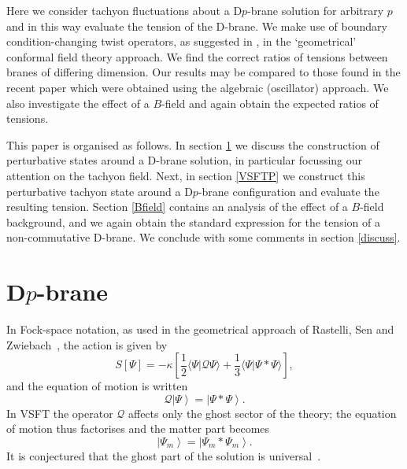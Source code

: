 \documentclass[letterpaper,12pt]{article}
\def\Pcm#1{{\mathcal{#1}}}
\begin{document}
Here we consider tachyon fluctuations about a D$p$-brane solution for arbitrary $p$ 
and in this way evaluate the tension of the D-brane. We make use of boundary condition-changing
twist operators, as suggested in \cite{RSZ4}, in the `geometrical' conformal field theory 
approach. We find the correct ratios of tensions between branes of differing dimension.
Our results may be compared to those found in the recent paper \cite{Okuyama}
 which were obtained using the algebraic (oscillator) \cite{Muk,GJ1,GJ2} approach.
We also investigate the effect of a $B$-field and again obtain the expected ratios of tensions.

This paper is organised as follows. In section \ref{Dpbrane} we discuss the construction of
perturbative states around a D-brane solution, in particular focussing our attention on 
the tachyon field. Next, in section \ref{VSFTP} we construct this perturbative tachyon state 
around a D$p$-brane configuration and evaluate the resulting tension. 
 Section \ref{Bfield} contains an analysis
of the effect of a $B$-field background, and we again obtain the standard expression for the
tension of a non-commutative D-brane. We conclude with some comments in section \ref{discuss}.

\section{D$p$-brane}
\label{Dpbrane}

In Fock-space notation, as used in the geometrical approach of Rastelli, Sen and 
Zwiebach~\cite{RSZ5}, the action is given by
\begin{equation}
\label{VSFTact}
S[\Psi]=-\kappa\left[\frac12\big\langle\Psi\big|\Pcm{Q}\Psi\big\rangle+\frac13\big\langle\Psi\big|\Psi * \Psi\big\rangle \right]
,\end{equation}
and the equation of motion is written
\begin{equation}
\label{EOM}
\Pcm{Q}\left|\Psi\right\rangle = \left|\Psi * \Psi \right\rangle
.\end{equation}
In VSFT the operator $\Pcm{Q}$ affects only the ghost sector 
of the theory; the equation of motion thus 
factorises and the matter part becomes
\begin{equation}
\left|\Psi_m\right\rangle = \left|\Psi_m * \Psi_m \right\rangle
.\end{equation}
It is conjectured that the ghost part of the solution is universal~\cite{Sen}.
\end{document}
